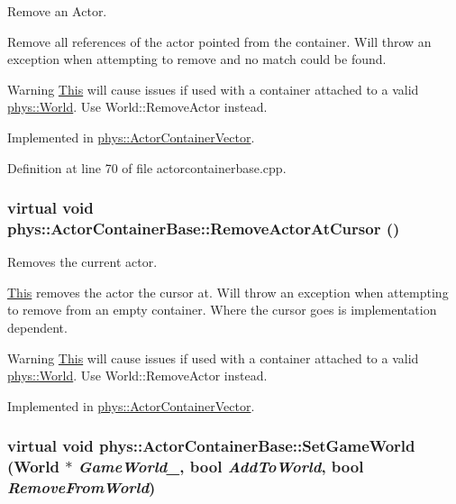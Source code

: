 Remove an Actor. 

Remove all references of the actor pointed from the container. Will throw an exception when attempting to remove and no match could be found. \begin{DoxyWarning}{Warning}
\hyperlink{structThis}{This} will cause issues if used with a container attached to a valid \hyperlink{classphys_1_1World}{phys::World}. Use World::RemoveActor instead. 
\end{DoxyWarning}


Implemented in \hyperlink{classphys_1_1ActorContainerVector_aeee5bd81601faed85e6a35f576c8d476}{phys::ActorContainerVector}.



Definition at line 70 of file actorcontainerbase.cpp.

\hypertarget{classphys_1_1ActorContainerBase_a60f37a056e8750f3b389c5ceed14520c}{
\subsubsection[{RemoveActorAtCursor}]{\setlength{\rightskip}{0pt plus 5cm}virtual void phys::ActorContainerBase::RemoveActorAtCursor ()}}
\label{d1/d00/classphys_1_1ActorContainerBase_a60f37a056e8750f3b389c5ceed14520c}


Removes the current actor. 

\hyperlink{structThis}{This} removes the actor the cursor at. Will throw an exception when attempting to remove from an empty container. Where the cursor goes is implementation dependent. \begin{DoxyWarning}{Warning}
\hyperlink{structThis}{This} will cause issues if used with a container attached to a valid \hyperlink{classphys_1_1World}{phys::World}. Use World::RemoveActor instead. 
\end{DoxyWarning}


Implemented in \hyperlink{classphys_1_1ActorContainerVector_a430977daf010a25f53df6cf37954f8ca}{phys::ActorContainerVector}.

\hypertarget{classphys_1_1ActorContainerBase_a366c1797bef08f3a1846bf010e2e2b04}{
\subsubsection[{SetGameWorld}]{\setlength{\rightskip}{0pt plus 5cm}virtual void phys::ActorContainerBase::SetGameWorld ({\bf World} $\ast$ {\em GameWorld\_\-}, \/  bool {\em AddToWorld}, \/  bool {\em RemoveFromWorld})}}
\label{d1/d00/classphys_1_1ActorContainerBase_a366c1797bef08f3a1846bf010e2e2b04}


